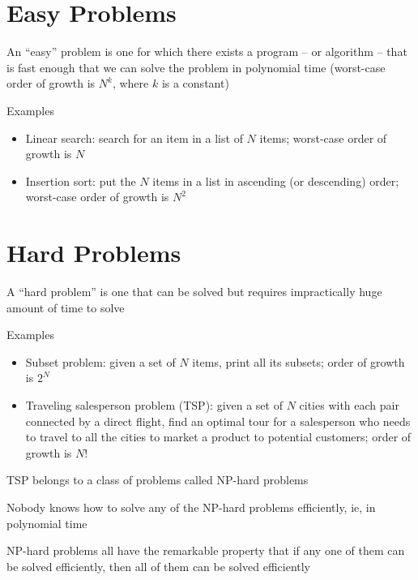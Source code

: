\documentclass[8pt,a4paper,compress]{beamer}
\begin{document}
\section{Easy Problems}
\begin{frame}[fragile]
\pause

An ``easy'' problem is one for which there exists a program -- or algorithm -- that is fast enough that we can solve the problem in polynomial time (worst-case order of growth is $N^k$, where $k$ is a constant)

\pause
\bigskip

Examples
\begin{itemize}
\item Linear search: search for an item in a list of $N$ items; worst-case order of growth is $N$

\item Insertion sort: put the $N$ items in a list in ascending (or descending) order; worst-case order of growth is $N^2$
\end{itemize}
\end{frame}

\section{Hard Problems}
\begin{frame}[fragile]
\pause

A ``hard problem'' is one that can be solved but requires impractically huge amount of time to solve

\pause
\bigskip

Examples
\begin{itemize}
\item Subset problem: given a set of $N$ items, print all its subsets; order of growth is $2^N$

\item Traveling salesperson problem (TSP): given a set of $N$ cities with each pair connected by a direct flight, find an optimal tour for a salesperson who needs to travel to all the cities to market a product to potential customers; order of growth is $N!$
\end{itemize}

\pause
\bigskip

TSP belongs to a class of problems called NP-hard problems

\pause
\bigskip

Nobody knows how to solve any of the NP-hard problems efficiently, ie, in polynomial time

\pause
\bigskip

NP-hard problems all have the remarkable property that if any one of them can be solved efficiently, then all of them can be solved efficiently
\end{frame}
\end{document}
